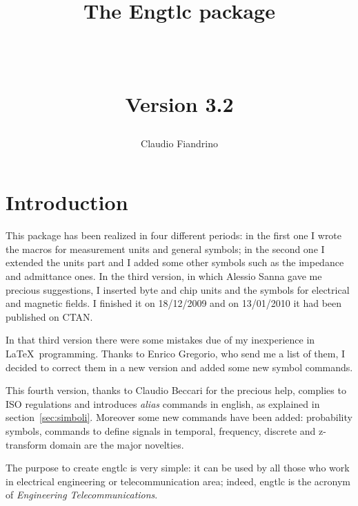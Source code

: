 \documentclass[11pt,a4paper,openany]{book}
\begin{document}
\frontmatter
\begin{titlepage}
\title{\begin{huge}\textbf{The \textsf{Engtlc} package}\end{huge}\\[.5cm]
       \begin{large}Version 3.2\end{large}}
\author{\begin{LARGE}Claudio Fiandrino \end{LARGE}}
\maketitle
\end{titlepage}
\hypersetup{urlcolor=blue}
\hypersetup{linkcolor=blue}
\pagestyle{fancy}
\renewcommand{\chaptermark}[1]{%
 \markboth{\MakeUppercase{%
 \chaptername}\ \thechapter.%
 \ #1}{}}
\renewcommand{\sectionmark}[1]{\markright{\thesection.\ #1}}
\fancyhead[RO,LE]{\thepage}
\fancyhead[RE]{\leftmark}
\fancyhead[LO]{\rightmark}
\fancyfoot{}
\tableofcontents

\mainmatter
\chapter{Introduction}
This package has been realized in four different periods: in the first one I wrote the macros for  measurement units and general symbols; in the second one I extended the units part and I added some other symbols such as the impedance and admittance ones.
In the third version, in which Alessio Sanna gave me precious suggestions, I inserted byte and chip units and the symbols for electrical and magnetic fields. I finished it on 18/12/2009 and on 13/01/2010 it had been published on CTAN. 

In that third version there were some mistakes due of my inexperience in \LaTeX\ programming.  Thanks to Enrico Gregorio, who send me a list of them, I decided to correct them in a new version and added some new symbol commands.

This fourth version, thanks to Claudio Beccari for the precious help, complies to ISO regulations and introduces \emph{alias} commands in english, as explained in section~\ref{sec:simboli}. Moreover some new commands have been added: probability symbols, commands to define signals in temporal, frequency, discrete and z-transform domain are the major novelties.

The purpose to create \textsf{engtlc} is very simple: it can be used by all those who work in electrical engineering or telecommunication area; indeed, \textsf{engtlc} is the acronym of \emph{Engineering Telecommunications}. 
\end{document}
